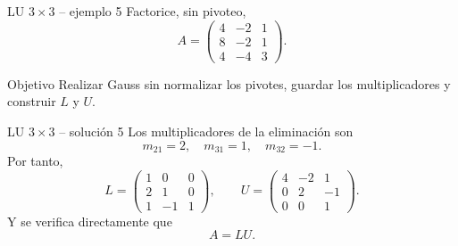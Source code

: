 \documentclass[aspectratio=169,10pt]{beamer}
\begin{document}
\begin{frame}{LU $3\times 3$ -- ejemplo 5}
\small
Factorice, sin pivoteo,
\[
A=\begin{pmatrix}4 & -2 & 1\\8 & -2 & 1\\4 & -4 & 3\end{pmatrix}.
\]
\begin{block}{Objetivo}
Realizar Gauss sin normalizar los pivotes, guardar los multiplicadores y construir $L$ y $U$.
\end{block}
\end{frame}
\begin{frame}{LU $3\times 3$ -- solución 5}
\small
Los multiplicadores de la eliminación son
\[
m_{21}=2,\quad m_{31}=1,\quad m_{32}=-1.
\]
Por tanto,
\[
L=\begin{pmatrix}1 & 0 & 0\\2 & 1 & 0\\1 & -1 & 1\end{pmatrix},\qquad U=\begin{pmatrix}4 & -2 & 1\\0 & 2 & -1\\0 & 0 & 1\end{pmatrix}.
\]
Y se verifica directamente que
\[
\boxed{A=LU}.
\]
\end{frame}
\end{document}
